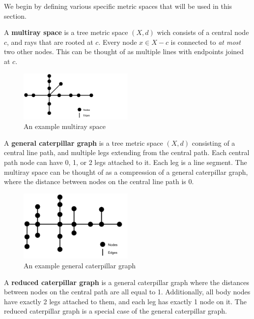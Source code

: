 We begin by defining various specific metric spaces that will be used in this section.
\begin{definition}
    A \textbf{multiray space} is a tree metric space $(X, d)$ wich consists of a central node $c$, and rays that are rooted at $c$. Every node $x \in X - c$ is connected to \textit{at most} two other nodes. This can be thought of as multiple lines with endpoints joined at $c$.
\end{definition}

\begin{figure}[H]
    \centering
    \includegraphics[width=0.5\textwidth]{images/multiray.png}
    \caption{An example multiray space}
\end{figure}

\begin{definition}
    A \textbf{general caterpillar graph} is a tree metric space $(X, d)$ consisting of a central line path, and multiple legs extending from the central path. Each central path node can have 0, 1, or 2 legs attached to it. Each leg is a line segment. The multiray space can be thought of as a compression of a general caterpillar graph, where the distance between nodes on the central line path is 0.
\end{definition}

\begin{figure}[H]
    \centering
    \includegraphics[width=0.5\textwidth]{images/generalCaterpillar.png}
    \caption{An example general caterpillar graph}
\end{figure}

\begin{definition}
    A \textbf{reduced caterpillar graph} is a general caterpillar graph where the distances between nodes on the central path are all equal to 1. Additionally, all body nodes have exactly 2 legs attached to them, and each leg has exactly 1 node on it. The reduced caterpillar graph is a special case of the general caterpillar graph.
\end{definition}

